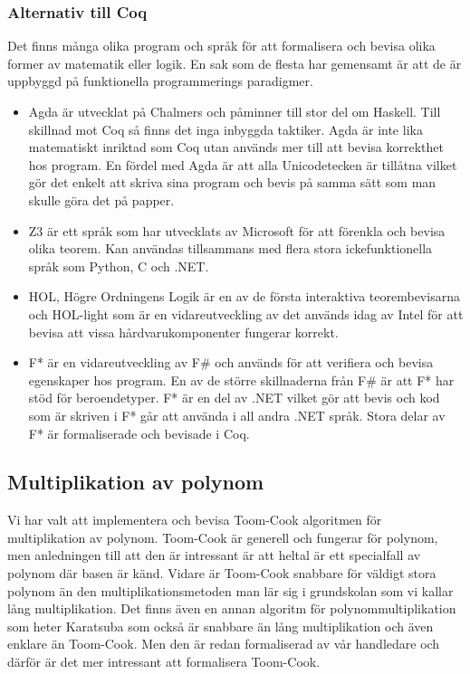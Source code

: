 \subsubsection{Alternativ till Coq}
Det finns många olika program och språk för att formalisera och bevisa olika
former av matematik eller logik. En sak som de flesta har gemensamt är att de
är uppbyggd på funktionella programmerings paradigmer.

\begin{itemize}
\item Agda är utvecklat på Chalmers och påminner till stor del om Haskell. Till
skillnad mot Coq så finns det inga inbyggda taktiker.  Agda är inte lika
matematiskt inriktad som Coq utan används mer till att bevisa korrekthet hos
program. En fördel med Agda är att alla Unicodetecken är tillåtna vilket gör
det enkelt att skriva sina program och bevis på samma sätt som man skulle göra
det på papper.

\item Z3 är ett språk som har utvecklats av Microsoft för att förenkla och bevisa
olika teorem. Kan användas tillsammans med flera stora ickefunktionella språk
som Python, C och .NET.

\item HOL, Högre Ordningens Logik är en av de första interaktiva teorembevisarna och
HOL-light som är en vidareutveckling av det används idag av Intel för att
bevisa att vissa hårdvarukomponenter fungerar korrekt.

\item F* är en vidareutveckling av F\# och används för att verifiera och bevisa
egenskaper hos program. En av de större skillnaderna från F\# är att F* har
stöd för beroendetyper. F* är en del av .NET vilket gör att bevis och kod som
är skriven i F* går att använda i all andra .NET språk. Stora delar av F* är
formaliserade och bevisade i Coq.
\end{itemize}

\begin{comment}
Källor och annat material
HOL http://www.cl.cam.ac.uk/~jrh13/hol-light/
Z3 http://research.microsoft.com/en-us/um/redmond/projects/z3/old/
F* http://research.microsoft.com/en-us/projects/fstar/
\end{comment}

\subsection{Multiplikation av polynom}
Vi har valt att implementera och bevisa Toom-Cook algoritmen för multiplikation
av polynom. Toom-Cook är generell och fungerar för polynom, men anledningen
till att den är intressant är att heltal är ett specialfall av polynom där
basen är känd. Vidare är Toom-Cook snabbare för väldigt stora polynom än den
multiplikationsmetoden man lär sig i grundskolan som vi kallar lång
multiplikation. Det finns även en annan algoritm för polynommultiplikation som
heter Karatsuba som också är snabbare än lång multiplikation och även enklare
än Toom-Cook. Men den är redan formaliserad av vår handledare och därför är det
mer intressant att formalisera Toom-Cook.

